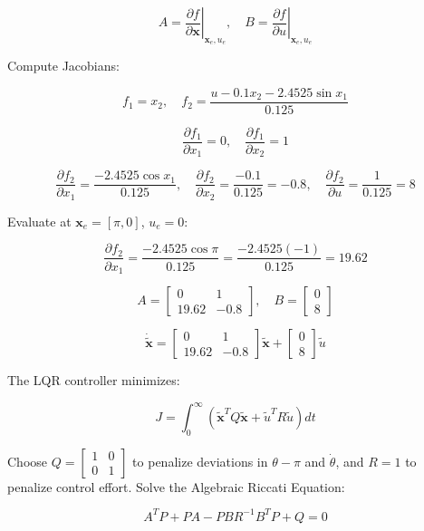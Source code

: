 \documentclass[12pt,a4paper]{article}
\begin{document}
\[
A = \left. \frac{\partial f}{\partial \mathbf{x}} \right|_{\mathbf{x}_e, u_e}, \quad B = \left. \frac{\partial f}{\partial u} \right|_{\mathbf{x}_e, u_e}
\]

Compute Jacobians:

\[
f_1 = x_2, \quad f_2 = \frac{u - 0.1 x_2 - 2.4525 \sin x_1}{0.125}
\]

\[
\frac{\partial f_1}{\partial x_1} = 0, \quad \frac{\partial f_1}{\partial x_2} = 1
\]

\[
\frac{\partial f_2}{\partial x_1} = \frac{-2.4525 \cos x_1}{0.125}, \quad \frac{\partial f_2}{\partial x_2} = \frac{-0.1}{0.125} = -0.8, \quad \frac{\partial f_2}{\partial u} = \frac{1}{0.125} = 8
\]

Evaluate at \( \mathbf{x}_e = [\pi, 0] \), \( u_e = 0 \):

\[
\frac{\partial f_2}{\partial x_1} = \frac{-2.4525 \cos \pi}{0.125} = \frac{-2.4525 (-1)}{0.125} = 19.62
\]

\[
A = \begin{bmatrix} 0 & 1 \\ 19.62 & -0.8 \end{bmatrix}, \quad B = \begin{bmatrix} 0 \\ 8 \end{bmatrix}
\]

\[
\dot{\tilde{\mathbf{x}}} = \begin{bmatrix} 0 & 1 \\ 19.62 & -0.8 \end{bmatrix} \tilde{\mathbf{x}} + \begin{bmatrix} 0 \\ 8 \end{bmatrix} \tilde{u}
\]

The LQR controller minimizes:

\begin{equation}
J = \int_0^\infty \left( \tilde{\mathbf{x}}^T Q \tilde{\mathbf{x}} + \tilde{u}^T R \tilde{u} \right) dt
\end{equation}

Choose \( Q = \begin{bmatrix} 1 & 0 \\ 0 & 1 \end{bmatrix} \) to penalize deviations in \( \theta - \pi \) and \( \dot{\theta} \), and \( R = 1 \) to penalize control effort. Solve the Algebraic Riccati Equation:

\begin{equation}
A^T P + P A - P B R^{-1} B^T P + Q = 0
\end{equation}
\end{document}

